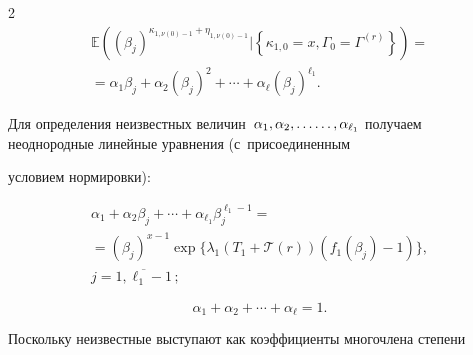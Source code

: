 \begin{multicols}{2}
\begin{multline*}
\!\mathbb{E}\left((\beta_{j})^{\kappa_{1,\nu(0)-1}+\eta_{1,\nu(0)-1}}

\Big\vert  \left\{\kappa_{1,0}=x,\Gamma_{0}=\Gamma^{(r)}\right\}\right)={}\\

{}=

\alpha_{1}\beta_{j}+\alpha_{2}(\beta_{j})^{2}+\cdots

+\alpha_{\ell}(\beta_{j})^{\ell_1}.

\end{multline*}



\vspace*{-4pt}



\noindent

Для определения неизвестных величин~$\alpha_1, \alpha_2, \ldots\linebreak

\ldots,

\alpha_{\ell_1}$ получаем неоднородные линейные уравнения (с~присоединенным

условием нормировки):



\columnbreak



\noindent

\begin{multline*}

  \alpha_{1}+\alpha_{2}\beta_{j}+\cdots+\alpha_{\ell_1}\beta_{j}^{\ell_1-1}={}\\

  {}=

  (\beta_{j})^{x-1}\exp\{\lambda_{1}(T_{1}+

  \mathcal T(r))(f_{1}(\beta_{j})-1)\},\\

   j=\overline{1,\ell_1-1}\,;

   \end{multline*}

   

   \vspace*{-9pt}

   

   \noindent

   $$

\alpha_{1}+\alpha_{2}+\cdots+\alpha_{\ell}=1.

$$

Поскольку неизвестные выступают как коэффициенты многочлена степени


\end{multicols}
